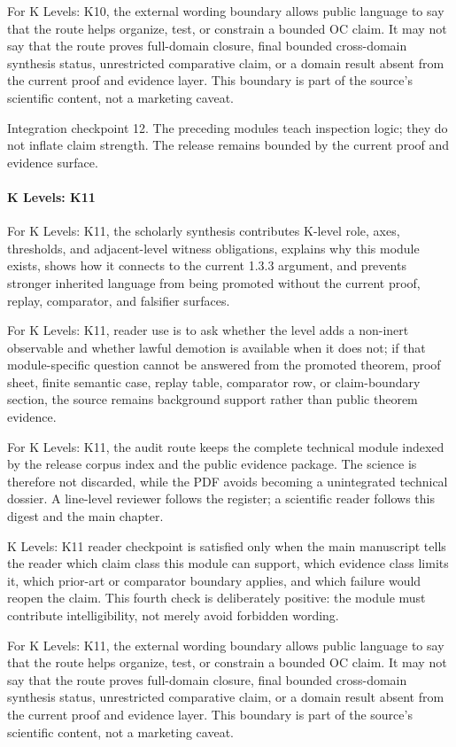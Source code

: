 For K Levels: K10, the external wording boundary allows public language to say that the route helps organize, test, or constrain a bounded OC claim. It may not say that the route proves full-domain closure, final bounded cross-domain synthesis status, unrestricted comparative claim, or a domain result absent from the current proof and evidence layer. This boundary is part of the source's scientific content, not a marketing caveat.


Integration checkpoint 12. The preceding modules teach inspection logic; they do not inflate claim strength. The release remains bounded by the current proof and evidence surface.


\paragraph{K Levels: K11}

For K Levels: K11, the scholarly synthesis contributes K-level role, axes, thresholds, and adjacent-level witness obligations, explains why this module exists, shows how it connects to the current 1.3.3 argument, and prevents stronger inherited language from being promoted without the current proof, replay, comparator, and falsifier surfaces.


For K Levels: K11, reader use is to ask whether the level adds a non-inert observable and whether lawful demotion is available when it does not; if that module-specific question cannot be answered from the promoted theorem, proof sheet, finite semantic case, replay table, comparator row, or claim-boundary section, the source remains background support rather than public theorem evidence.


For K Levels: K11, the audit route keeps the complete technical module indexed by the release corpus index and the public evidence package. The science is therefore not discarded, while the PDF avoids becoming a unintegrated technical dossier. A line-level reviewer follows the register; a scientific reader follows this digest and the main chapter.


K Levels: K11 reader checkpoint is satisfied only when the main manuscript tells the reader which claim class this module can support, which evidence class limits it, which prior-art or comparator boundary applies, and which failure would reopen the claim. This fourth check is deliberately positive: the module must contribute intelligibility, not merely avoid forbidden wording.


For K Levels: K11, the external wording boundary allows public language to say that the route helps organize, test, or constrain a bounded OC claim. It may not say that the route proves full-domain closure, final bounded cross-domain synthesis status, unrestricted comparative claim, or a domain result absent from the current proof and evidence layer. This boundary is part of the source's scientific content, not a marketing caveat.


